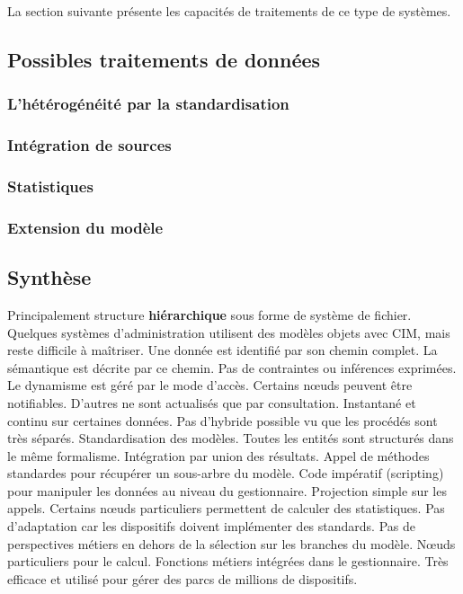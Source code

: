 La section suivante présente les capacités de traitements de ce type de systèmes.

\subsection{Possibles traitements de données}
\subsubsection{L'hétérogénéité par la standardisation}
\subsubsection{Intégration de sources}
\subsubsection{Statistiques}
\subsubsection{Extension du modèle}
\subsection{Synthèse}

\begin{table}[ht]
\criteretabDonnee
    {Principalement structure \textbf{hiérarchique} sous forme de système de fichier. Quelques systèmes d'administration utilisent des modèles objets avec CIM, mais reste difficile à maîtriser.}
    {Une donnée est identifié par son chemin complet. La sémantique est décrite par ce chemin. Pas de contraintes ou inférences exprimées.}
    {Le dynamisme est géré par le mode d'accès. Certains nœuds peuvent être notifiables. D'autres ne sont actualisés que par consultation.}
\criteretabTraitement
    {Instantané et continu sur certaines données. Pas d'hybride possible vu que les procédés sont très séparés.}
    {Standardisation des modèles. Toutes les entités sont structurés dans le même formalisme. Intégration par union des résultats.}
    {Appel de méthodes standardes pour récupérer un sous-arbre du modèle. Code impératif (scripting) pour manipuler les données au niveau du gestionnaire.}
    {Projection simple sur les appels. Certains nœuds particuliers permettent de calculer des statistiques.}
\criteretabAdaptabilite
    {Pas d'adaptation car les dispositifs doivent implémenter des standards.}
    {Pas de perspectives métiers en dehors de la sélection sur les branches du modèle.}
    {Nœuds particuliers pour le calcul. Fonctions métiers intégrées dans le gestionnaire.}
    {Très efficace et utilisé pour gérer des parcs de millions de dispositifs.}
\end{table}